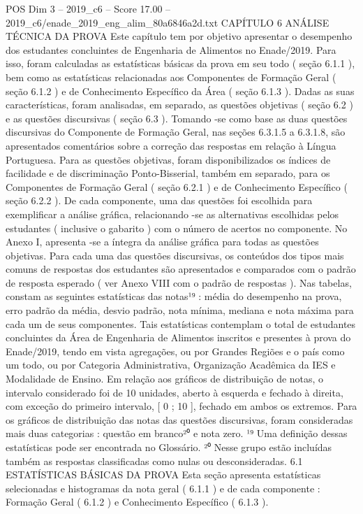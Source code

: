 \begin{textsample}{POS Dim 3 – 2019\_c6 – Score 17.00 – 2019\_c6/enade\_2019\_eng\_alim\_80a6846a2d.txt}  \label{ex:f3_pos_005}
CAPÍTULO 6 ANÁLISE TÉCNICA DA PROVA Este capítulo tem por objetivo apresentar o desempenho dos estudantes concluintes de Engenharia de Alimentos no Enade/2019.
Para isso, foram calculadas as estatísticas básicas da prova em seu todo ( seção 6.1.1 ), bem como as estatísticas relacionadas aos Componentes de Formação Geral ( seção 6.1.2 ) e de Conhecimento Específico da Área ( seção 6.1.3 ).
Dadas as suas características, foram analisadas, em separado, as questões objetivas ( seção 6.2 ) e as questões discursivas ( seção 6.3 ).
Tomando -se como base as duas questões discursivas do Componente de Formação Geral, nas seções 6.3.1.5 a 6.3.1.8, são apresentados comentários sobre a correção das respostas em relação à Língua Portuguesa.
Para as questões objetivas, foram disponibilizados os índices de facilidade e de discriminação Ponto-Bisserial, também em separado, para os Componentes de Formação Geral ( seção 6.2.1 ) e de Conhecimento Específico ( seção 6.2.2 ).
De cada componente, uma das questões foi escolhida para exemplificar a análise gráfica, relacionando -se as alternativas escolhidas pelos estudantes ( inclusive o gabarito ) com o número de acertos no componente.
No Anexo I, apresenta -se a íntegra da análise gráfica para todas as questões objetivas.
Para cada uma das questões discursivas, os conteúdos dos tipos mais comuns de respostas dos estudantes são apresentados e comparados com o padrão de resposta esperado ( ver Anexo VIII com o padrão de respostas ).
Nas tabelas, constam as seguintes estatísticas das notas¹⁹ : média do desempenho na prova, erro padrão da média, desvio padrão, nota mínima, mediana e nota máxima para cada um de seus componentes.
Tais estatísticas contemplam o total de estudantes concluintes da Área de Engenharia de Alimentos inscritos e presentes à prova do Enade/2019, tendo em vista agregações, ou por Grandes Regiões e o país como um todo, ou por Categoria Administrativa, Organização Acadêmica da IES e Modalidade de Ensino.
Em relação aos gráficos de distribuição de notas, o intervalo considerado foi de 10 unidades, aberto à esquerda e fechado à direita, com exceção do primeiro intervalo, [ 0 ; 10 ], fechado em ambos os extremos.
Para os gráficos de distribuição das notas das questões discursivas, foram consideradas mais duas categorias : questão em branco²⁰ e nota zero. ¹⁹ Uma definição dessas estatísticas pode ser encontrada no Glossário. ²⁰ Nesse grupo estão incluídas também as respostas classificadas como nulas ou desconsideradas. 6.1 ESTATÍSTICAS BÁSICAS DA PROVA Esta seção apresenta estatísticas selecionadas e histogramas da nota geral ( 6.1.1 ) e de cada componente : Formação Geral ( 6.1.2 ) e Conhecimento Específico ( 6.1.3 ).

\end{textsample}
